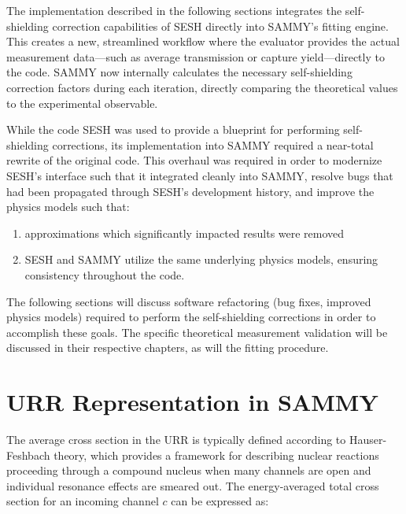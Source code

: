 The implementation described in the following sections integrates the self-shielding correction capabilities of SESH directly into SAMMY’s fitting engine. This creates a new, streamlined workflow where the evaluator provides the actual measurement data—such as average transmission or capture yield—directly to the code. SAMMY now internally calculates the necessary self-shielding correction factors during each iteration, directly comparing the theoretical values to the experimental observable.

While the code SESH was used to provide a blueprint for performing self-shielding corrections, its implementation into SAMMY required a near-total rewrite of the original code. This overhaul was required in order to modernize SESH's interface such that it integrated cleanly into SAMMY, resolve bugs that had been propagated through SESH's development history, and improve the physics models such that:
\begin{enumerate}
    \item approximations which significantly impacted results were removed
    \item SESH and SAMMY utilize the same underlying physics models, ensuring consistency throughout the code.
\end{enumerate}

The following sections will discuss software refactoring (bug fixes, improved physics models) required to perform the self-shielding corrections in order to accomplish these goals. The specific theoretical measurement validation will be discussed in their respective chapters, as will the fitting procedure.

\section{URR Representation in SAMMY}

The average cross section in the URR is typically defined according to Hauser-Feshbach theory, which provides a framework for describing nuclear reactions proceeding through a compound nucleus when many channels are open and individual resonance effects are smeared out. The energy-averaged total cross section for an incoming channel $c$ can be expressed as:

